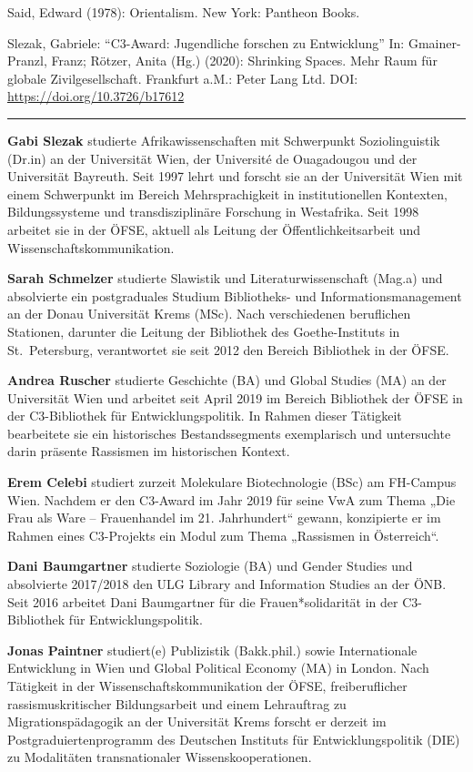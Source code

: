 \documentclass[a4paper,
fontsize=11pt,
oneside,
numbers=noperiodatend,
parskip=half-,
bibliography=totoc,
final
]{scrartcl}
\begin{document}
Said, Edward (1978): Orientalism. New York: Pantheon Books.

Slezak, Gabriele: \enquote{C3-Award: Jugendliche forschen zu
Entwicklung} In: Gmainer-Pranzl, Franz; Rötzer, Anita (Hg.) (2020):
Shrinking Spaces. Mehr Raum für globale Zivilgesellschaft. Frankfurt
a.M.: Peter Lang Ltd. DOI: \url{https://doi.org/10.3726/b17612}

\begin{center}\rule{0.5\linewidth}{0.5pt}\end{center}

\textbf{Gabi Slezak} studierte Afrikawissenschaften mit Schwerpunkt
Soziolinguistik (Dr.in) an der Universität Wien, der Université de
Ouagadougou und der Universität Bayreuth. Seit 1997 lehrt und forscht
sie an der Universität Wien mit einem Schwerpunkt im Bereich
Mehrsprachigkeit in institutionellen Kontexten, Bildungssysteme und
transdisziplinäre Forschung in Westafrika. Seit 1998 arbeitet sie in der
ÖFSE, aktuell als Leitung der Öffentlichkeitsarbeit und
Wissenschaftskommunikation.

\textbf{Sarah Schmelzer} studierte Slawistik und Literaturwissenschaft
(Mag.a) und absolvierte ein postgraduales Studium Bibliotheks- und
Informationsmanagement an der Donau Universität Krems (MSc). Nach
verschiedenen beruflichen Stationen, darunter die Leitung der Bibliothek
des Goe\-the-Instituts in St.~Petersburg, verantwortet sie seit 2012 den
Bereich Bibliothek in der ÖFSE.

\textbf{Andrea Ruscher} studierte Geschichte (BA) und Global Studies
(MA) an der Universität Wien und arbeitet seit April 2019 im Bereich
Bibliothek der ÖFSE in der C3-Bibliothek für Entwicklungspolitik. In
Rahmen dieser Tätigkeit bearbeitete sie ein historisches
Bestandssegments exemplarisch und untersuchte darin präsente Rassismen
im historischen Kontext.

\textbf{Erem Celebi} studiert zurzeit Molekulare Biotechnologie (BSc) am
FH-Campus Wien. Nachdem er den C3-Award im Jahr 2019 für seine VwA zum
Thema „Die Frau als Ware -- Frauenhandel im 21. Jahrhundert`` gewann,
konzipierte er im Rahmen eines C3-Projekts ein Modul zum Thema
„Rassismen in Österreich``.

\textbf{Dani Baumgartner} studierte Soziologie (BA) und Gender Studies
und absolvierte 2017/2018 den ULG Library and Information Studies an der
ÖNB. Seit 2016 arbeitet Dani Baumgartner für die Frauen*solidarität in
der C3-Bibliothek für Entwicklungspolitik.

\textbf{Jonas Paintner} studiert(e) Publizistik (Bakk.phil.) sowie
Internationale Entwicklung in Wien und Global Political Economy (MA) in
London. Nach Tätigkeit in der Wissenschaftskommunikation der ÖFSE,
freiberuflicher rassismuskritischer Bildungsarbeit und einem Lehrauftrag
zu Migrationspädagogik an der Universität Krems forscht er derzeit im
Postgraduiertenprogramm des Deutschen Instituts für Entwicklungspolitik
(DIE) zu Modalitäten transnationaler Wissenskooperationen.
\end{document}
